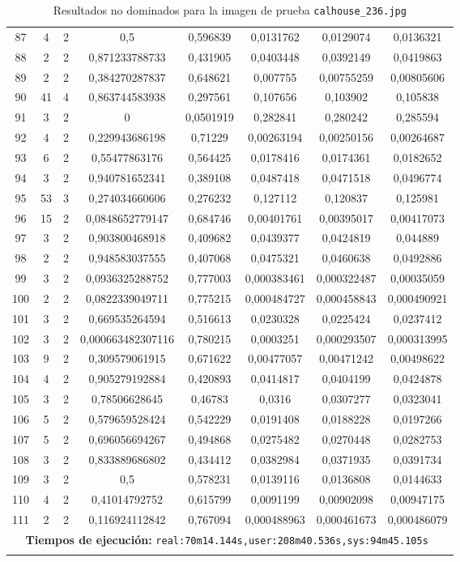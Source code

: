 \begin{longtable}{|c|c|c|c|c|c|c|c|}
87 & 4 & 2 & 0,5 & 0,596839 & 0,0131762 & 0,0129074 & 0,0136321  \\
88 & 2 & 2 & 0,871233788733 & 0,431905 & 0,0403448 & 0,0392149 & 0,0419863  \\
89 & 2 & 2 & 0,384270287837 & 0,648621 & 0,007755 & 0,00755259 & 0,00805606  \\
90 & 41 & 4 & 0,863744583938 & 0,297561 & 0,107656 & 0,103902 & 0,105838  \\
91 & 3 & 2 & 0 & 0,0501919 & 0,282841 & 0,280242 & 0,285594  \\
92 & 4 & 2 & 0,229943686198 & 0,71229 & 0,00263194 & 0,00250156 & 0,00264687  \\
93 & 6 & 2 & 0,55477863176 & 0,564425 & 0,0178416 & 0,0174361 & 0,0182652  \\
94 & 3 & 2 & 0,940781652341 & 0,389108 & 0,0487418 & 0,0471518 & 0,0496774  \\
95 & 53 & 3 & 0,274034660606 & 0,276232 & 0,127112 & 0,120837 & 0,125981  \\
96 & 15 & 2 & 0,0848652779147 & 0,684746 & 0,00401761 & 0,00395017 & 0,00417073  \\
97 & 3 & 2 & 0,903800468918 & 0,409682 & 0,0439377 & 0,0424819 & 0,044889  \\
98 & 2 & 2 & 0,948583037555 & 0,407068 & 0,0475321 & 0,0460638 & 0,0492886  \\
99 & 3 & 2 & 0,0936325288752 & 0,777003 & 0,000383461 & 0,000322487 & 0,00035059  \\
100 & 2 & 2 & 0,0822339049711 & 0,775215 & 0,000484727 & 0,000458843 & 0,000490921  \\
101 & 3 & 2 & 0,669535264594 & 0,516613 & 0,0230328 & 0,0225424 & 0,0237412  \\
102 & 3 & 2 & 0,000663482307116 & 0,780215 & 0,0003251 & 0,000293507 & 0,000313995  \\
103 & 9 & 2 & 0,309579061915 & 0,671622 & 0,00477057 & 0,00471242 & 0,00498622  \\
104 & 4 & 2 & 0,905279192884 & 0,420893 & 0,0414817 & 0,0404199 & 0,0424878  \\
105 & 3 & 2 & 0,78506628645 & 0,46783 & 0,0316 & 0,0307277 & 0,0323041  \\
106 & 5 & 2 & 0,579659528424 & 0,542229 & 0,0191408 & 0,0188228 & 0,0197266  \\
107 & 5 & 2 & 0,696056694267 & 0,494868 & 0,0275482 & 0,0270448 & 0,0282753  \\
108 & 3 & 2 & 0,833889686802 & 0,434412 & 0,0382984 & 0,0371935 & 0,0391734  \\
109 & 3 & 2 & 0,5 & 0,578231 & 0,0139116 & 0,0136808 & 0,0144633  \\
110 & 4 & 2 & 0,41014792752 & 0,615799 & 0,0091199 & 0,00902098 & 0,00947175  \\
111 & 2 & 2 & 0,116924112842 & 0,767094 & 0,000488963 & 0,000461673 & 0,000486079  \\
\multicolumn{8}{|c|}{\textbf{Tiempos de ejecución:} \texttt{real:70m14.144s,user:208m40.536s,sys:94m45.105s
}}\\  \hline
\caption{Resultados no dominados para la imagen de prueba \texttt{calhouse\_236.jpg}}
\label{tab:calhouse_236}
\end{longtable}

